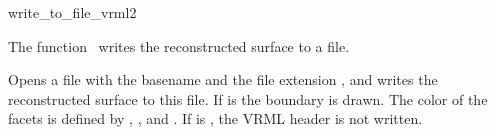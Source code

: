\begin{ccRefFunction}{write_to_file_vrml2}

\ccDefinition
  
The function \ccRefName\ writes the reconstructed surface to a file.


{Opens a file with the basename  and the file extension , and writes the
reconstructed surface to this file. If  is  the boundary is drawn.
The color of the facets is defined by , , and . If  is
, the VRML header is not written.}

\end{ccRefFunction}